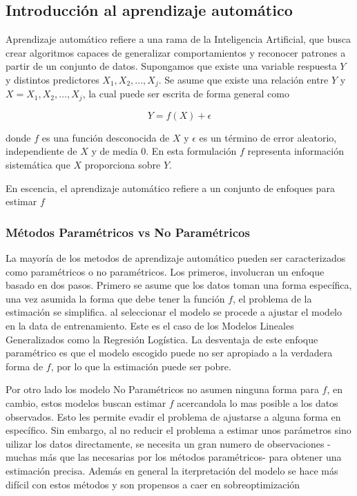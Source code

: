 \documentclass[a4paper,12pt]{Latex/Classes/PhDthesisPSnPDF}
\begin{document}
\subsection{Introducción al aprendizaje automático}

Aprendizaje automático refiere a una rama de la Inteligencia Artificial, que busca crear algoritmos capaces de generalizar comportamientos y reconocer patrones a partir de un conjunto de datos. Supongamos que existe una variable respuesta $Y$ y distintos predictores $X_{1}, X_{2}, ..., X_{j}$. Se asume que existe una relación entre $Y$ y $X = X_{1}, X_{2}, ..., X_{j}$, la cual puede ser escrita de forma general como

$$ Y = f(X) + \epsilon $$

donde $f$ es una función desconocida de $X$ y $\epsilon$ es un término de error aleatorio, independiente de $X$ y de media 0. En esta formulación $f$ representa información sistemática que $X$ proporciona sobre $Y$.

En escencia, el aprendizaje automático refiere a un conjunto de enfoques para estimar $f$

\subsubsection{Métodos Paramétricos vs No Paramétricos}

La mayoría de los metodos de aprendizaje automático pueden ser caracterizados como paramétricos o no paramétricos. Los primeros, involucran un enfoque basado en dos pasos. Primero se asume que los datos toman una forma específica, una vez asumida la forma que debe tener la función $f$, el problema de la estimación se simplifica. al seleccionar el modelo se procede a ajustar el modelo en la data de entrenamiento. Este es el caso de los Modelos Lineales Generalizados como la Regresión Logística. La desventaja de este enfoque paramétrico es que el modelo escogido puede no ser apropiado a la verdadera forma de $f$, por lo que la estimación puede ser pobre.

Por otro lado los modelo No Paramétricos no asumen ninguna forma para $f$, en cambio, estos modelos buscan estimar $f$ acercandola lo mas posible a los datos observados. Esto les permite evadir el problema de ajustarse a alguna forma en específico. Sin embargo, al no reducir el problema a estimar unos parámetros sino uilizar los datos directamente, se necesita un gran numero de observaciones -muchas más que las necesarias por los métodos paramétricos- para obtener una estimación precisa. Además en general la iterpretación del modelo se hace más difícil con estos métodos y son propensos a caer en sobreoptimización
\end{document}
